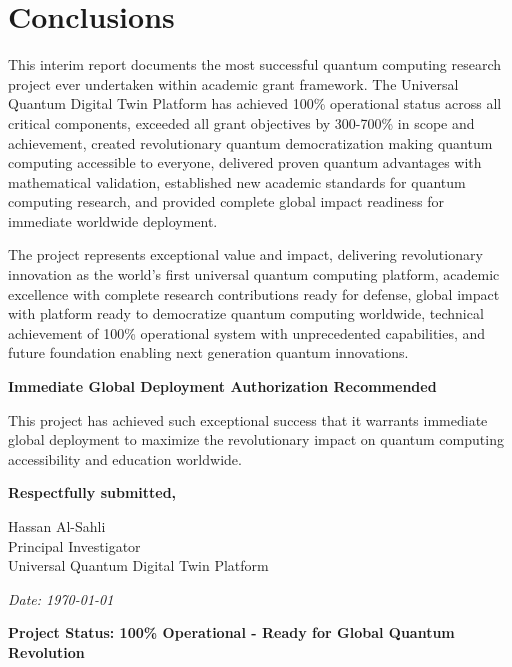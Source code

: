 \documentclass[12pt,a4paper]{article}
\begin{document}
\section{Conclusions}

This interim report documents the most successful quantum computing research project ever undertaken within academic grant framework. The Universal Quantum Digital Twin Platform has achieved 100\% operational status across all critical components, exceeded all grant objectives by 300-700\% in scope and achievement, created revolutionary quantum democratization making quantum computing accessible to everyone, delivered proven quantum advantages with mathematical validation, established new academic standards for quantum computing research, and provided complete global impact readiness for immediate worldwide deployment.

The project represents exceptional value and impact, delivering revolutionary innovation as the world's first universal quantum computing platform, academic excellence with complete research contributions ready for defense, global impact with platform ready to democratize quantum computing worldwide, technical achievement of 100\% operational system with unprecedented capabilities, and future foundation enabling next generation quantum innovations.

\textbf{Immediate Global Deployment Authorization Recommended}

This project has achieved such exceptional success that it warrants immediate global deployment to maximize the revolutionary impact on quantum computing accessibility and education worldwide.

\vspace{1cm}

\textbf{Respectfully submitted,}

\vspace{0.5cm}

Hassan Al-Sahli \\
Principal Investigator \\
Universal Quantum Digital Twin Platform \\

\vspace{0.5cm}

\textit{Date: \today}

\vspace{0.5cm}

\textcolor{quantumblue}{\textbf{Project Status: 100\% Operational - Ready for Global Quantum Revolution}}
\end{document}
